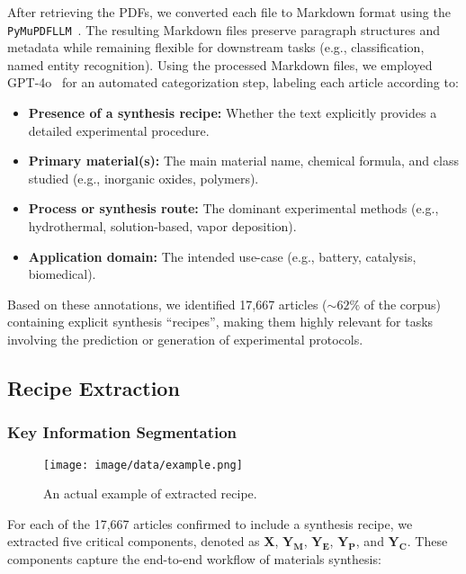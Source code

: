 After retrieving the PDFs, we converted each file to Markdown format using the \texttt{PyMuPDFLLM}~\cite{pymupdf4llm2024}. 
The resulting Markdown files preserve paragraph structures and metadata while remaining flexible for downstream tasks (e.g., classification, named entity recognition).
Using the processed Markdown files, we employed GPT-4o~\cite{achiam2023gpt} for an automated categorization step, labeling each article according to:

\begin{itemize}
    \item \textbf{Presence of a synthesis recipe:} Whether the text explicitly provides a detailed experimental procedure.
    \item \textbf{Primary material(s):} The main material name, chemical formula, and class studied (e.g., inorganic oxides, polymers).
    \item \textbf{Process or synthesis route:} The dominant experimental methods (e.g., hydrothermal, solution-based, vapor deposition).
    \item \textbf{Application domain:} The intended use-case (e.g., battery, catalysis, biomedical).
\end{itemize}

Based on these annotations, we identified 17,667 articles (\(\sim62\%\) of the corpus) containing explicit synthesis ``recipes'', making them highly relevant for tasks involving the prediction or generation of experimental protocols.

\subsection{Recipe Extraction}
\label{sec:recipe_extraction}

\subsubsection{Key Information Segmentation}

\begin{figure*}[t]
    \centering
    \texttt{[image: image/data/example.png]}
    \caption{An actual example of extracted recipe.}
    \label{fig:data-example}
\end{figure*}

For each of the 17,667 articles confirmed to include a synthesis recipe, we extracted five critical components, denoted as \textbf{X}, \(\mathbf{Y_M}\), \(\mathbf{Y_E}\), \(\mathbf{Y_P}\), and \(\mathbf{Y_C}\). These components capture the end-to-end workflow of materials synthesis:


